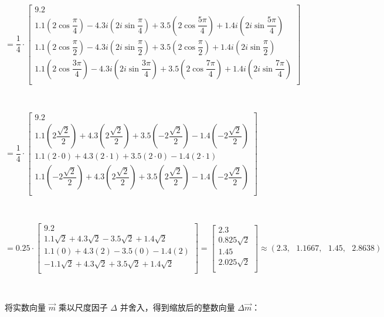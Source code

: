 $ $

$= \dfrac{1}{4} \cdot
\begin{bmatrix}
9.2\\
1.1\left(2\cos\dfrac{\pi}{4}\right) - 4.3i\left(2i\sin\dfrac{\pi}{4}\right) + 3.5\left(2\cos\dfrac{5\pi}{4}\right) + 1.4i\left(2i\sin\dfrac{5\pi}{4}\right)\\
1.1\left(2\cos\dfrac{\pi}{2}\right) - 4.3i\left(2i\sin\dfrac{\pi}{2}\right) + 3.5\left(2\cos\dfrac{\pi}{2}\right) + 1.4i\left(2i\sin\dfrac{\pi}{2}\right)\\
1.1\left(2\cos\dfrac{3\pi}{4}\right) - 4.3i\left(2i\sin\dfrac{3\pi}{4}\right) + 3.5 \left(2\cos\dfrac{7\pi}{4}\right) + 1.4i\left(2i\sin\dfrac{7\pi}{4}\right)\\
\end{bmatrix}$

$ $

$= \dfrac{1}{4} \cdot
\begin{bmatrix}
9.2\\
1.1\left(2\dfrac{\sqrt{2}}{2}\right) + 4.3\left(2\dfrac{\sqrt{2}}{2}\right) + 3.5\left(-2\dfrac{\sqrt{2}}{2}\right) - 1.4\left(-2\dfrac{\sqrt{2}}{2}\right)\\
1.1(2\cdot 0) + 4.3(2\cdot1) + 3.5(2\cdot 0) - 1.4(2\cdot 1)\\
1.1\left(-2\dfrac{\sqrt{2}}{2}\right) + 4.3\left(2\dfrac{\sqrt{2}}{2}\right) + 3.5 \left(2\dfrac{\sqrt{2}}{2}\right) - 1.4\left(-2\dfrac{\sqrt{2}}{2}\right)\\
\end{bmatrix}$

$ $

$= 0.25 \cdot
\begin{bmatrix}
9.2\\
1.1\sqrt{2} + 4.3{\sqrt{2}} - 3.5\sqrt{2} + 1.4\sqrt{2}\\
1.1(0) + 4.3(2) - 3.5(0) - 1.4(2)\\
-1.1\sqrt{2} + 4.3\sqrt{2} + 3.5\sqrt{2} + 1.4\sqrt{2}\\
\end{bmatrix} =
\begin{bmatrix}
2.3\\
0.825\sqrt{2}\\
1.45\\
2.025\sqrt{2}\\
\end{bmatrix} \approx (2.3, \text{ } 1.1667, \text{ } 1.45, \text{ } 2.8638)$

$ $

将实数向量 $\vec{m}$ 乘以尺度因子 $\Delta$ 并舍入，得到缩放后的整数向量 $\Delta\vec{m}$：

